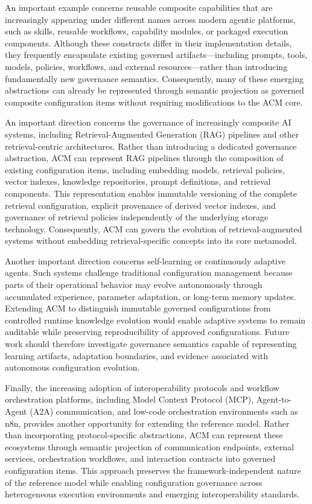\documentclass[10pt]{article}
\begin{document}
An important example concerns reusable composite capabilities that are increasingly appearing under different names across modern agentic platforms, such as skills, reusable workflows, capability modules, or packaged execution components. Although these constructs differ in their implementation details, they frequently encapsulate existing governed artifacts—including prompts, tools, models, policies, workflows, and external resources—rather than introducing fundamentally new governance semantics. Consequently, many of these emerging abstractions can already be represented through semantic projection as governed composite configuration items without requiring modifications to the ACM core.

An important direction concerns the governance of increasingly composite AI systems, including Retrieval-Augmented Generation (RAG) pipelines and other retrieval-centric architectures. Rather than introducing a dedicated governance abstraction, ACM can represent RAG pipelines through the composition of existing configuration items, including embedding models, retrieval policies, vector indexes, knowledge repositories, prompt definitions, and retrieval components. This representation enables immutable versioning of the complete retrieval configuration, explicit provenance of derived vector indexes, and governance of retrieval policies independently of the underlying storage technology. Consequently, ACM can govern the evolution of retrieval-augmented systems without embedding retrieval-specific concepts into its core metamodel.

Another important direction concerns self-learning or continuously adaptive agents. Such systems challenge traditional configuration management because parts of their operational behavior may evolve autonomously through accumulated experience, parameter adaptation, or long-term memory updates. Extending ACM to distinguish immutable governed configurations from controlled runtime knowledge evolution would enable adaptive systems to remain auditable while preserving reproducibility of approved configurations. Future work should therefore investigate governance semantics capable of representing learning artifacts, adaptation boundaries, and evidence associated with autonomous configuration evolution.

Finally, the increasing adoption of interoperability protocols and workflow orchestration platforms, including Model Context Protocol (MCP), Agent-to-Agent (A2A) communication, and low-code orchestration environments such as n8n, provides another opportunity for extending the reference model. Rather than incorporating protocol-specific abstractions, ACM can represent these ecosystems through semantic projection of communication endpoints, external services, orchestration workflows, and interaction contracts into governed configuration items. This approach preserves the framework-independent nature of the reference model while enabling configuration governance across heterogeneous execution environments and emerging interoperability standards.
\end{document}
